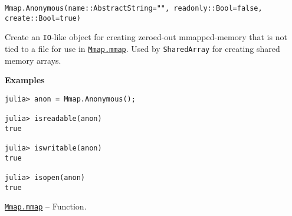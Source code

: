 \begin{adjustwidth}{2em}{0pt}


\begin{verbatim}
Mmap.Anonymous(name::AbstractString="", readonly::Bool=false, create::Bool=true)
\end{verbatim}

Create an \texttt{IO}-like object for creating zeroed-out mmapped-memory that is not tied to a file for use in \hyperlink{1028440884226576897}{\texttt{Mmap.mmap}}. Used by \texttt{SharedArray} for creating shared memory arrays.

\textbf{Examples}


\begin{verbatim}
julia> anon = Mmap.Anonymous();

julia> isreadable(anon)
true

julia> iswritable(anon)
true

julia> isopen(anon)
true
\end{verbatim}



\end{adjustwidth}
\hypertarget{1028440884226576897}{} 
\hyperlink{1028440884226576897}{\texttt{Mmap.mmap}}  -- {Function.}


